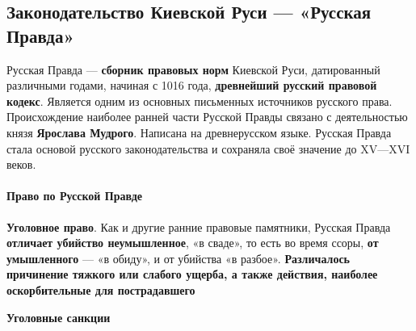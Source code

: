 \documentclass{article}
\begin{document}
\subsection{Законодательство Киевской Руси — «Русская Правда»}

Русская Правда — \textbf{сборник правовых норм} Киевской Руси, датированный различными годами, начиная с 1016 года, \textbf{древнейший русский правовой кодекс}. Является одним из основных письменных источников русского права. Происхождение наиболее ранней части Русской Правды связано с деятельностью князя \textbf{Ярослава Мудрого}. Написана на древнерусском языке. Русская Правда стала основой русского законодательства и сохраняла своё значение до XV—XVI веков.

\paragraph{Право по Русской Правде}

\textbf{Уголовное право}. Как и другие ранние правовые памятники, Русская Правда \textbf{отличает убийство неумышленное}, «в сваде», то есть во время ссоры, \textbf{от умышленного} — «в обиду», и от убийства «в разбое». \textbf{Различалось причинение тяжкого или слабого ущерба, а также действия, наиболее оскорбительные для пострадавшего}

\textbf{Уголовные санкции}
\end{document}
